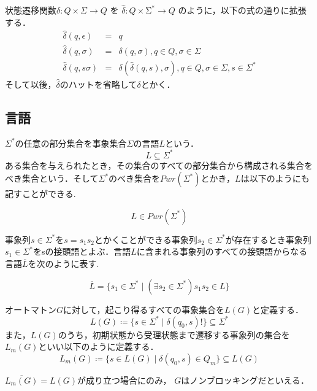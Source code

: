 状態遷移関数$\delta:Q\times\Sigma\rightarrow Q$
を
$\hat{\delta}:Q\times\mathrm{\Sigma}^\ast\rightarrow Q$
のように，以下の式の通りに拡張する．
\begin{eqnarray*}
    \hat{\delta}(q,\epsilon) &=& q\\
    \hat{\delta}(q,\sigma) &=& \delta(q,\sigma), q\in Q, \sigma\in\Sigma\\
    \hat{\delta}(q,s\sigma) &=& \delta(\hat{\delta}(q,s),\sigma), q\in Q, \sigma\in\Sigma, s\in\Sigma^\ast
\end{eqnarray*}
そして以後，$\hat{\delta}$のハットを省略して$\delta$とかく．


\subsection{言語}

$\Sigma^\ast$の任意の部分集合を事象集合$\Sigma$の言語$L$という．
\begin{equation}
    L\subseteq\Sigma^\ast
\end{equation}
ある集合を与えられたとき，その集合のすべての部分集合から構成される集合をべき集合という．そして$\Sigma^\ast$のべき集合を$Pwr(\Sigma^\ast)$とかき，$L$は以下のようにも記すことができる.

\begin{equation}
    L\in Pwr(\Sigma^\ast)
\end{equation}

事象列$s\in\Sigma^\ast$を$s=s_1 s_2$とかくことができる事象列$s_2\in\Sigma^\ast$が存在するとき事象列$s_1\in\Sigma^\ast$をsの接頭語とよぶ．言語$L$に含まれる事象列のすべての接頭語からなる言語$\overline{L}$を次のように表す.

\begin{equation}
    \overline{L} = \{ s_1 \in\Sigma^\ast\mid(\exists s_2 \in \Sigma^\ast) s_1 s_2\in L\}
\end{equation}

オートマトン$G$に対して，起こり得るすべての事象集合を$L(G)$と定義する．
\begin{equation}
    L(G) \coloneqq \{s\in \Sigma^\ast \mid \delta(q_0, s)! \}\subseteq\Sigma^\ast
\end{equation}
また，$L(G)$のうち，初期状態から受理状態まで遷移する事象列の集合を$L_m(G)$といい以下のように定義する．
\begin{equation}
    L_m(G) \coloneqq \{s\in L(G) \mid \delta(q_0, s) \in Q_m\} \subseteq L(G)
\end{equation}

$\overline{L_m(G)}=L(G)$が成り立つ場合にのみ， $G$はノンブロッキングだといえる．


